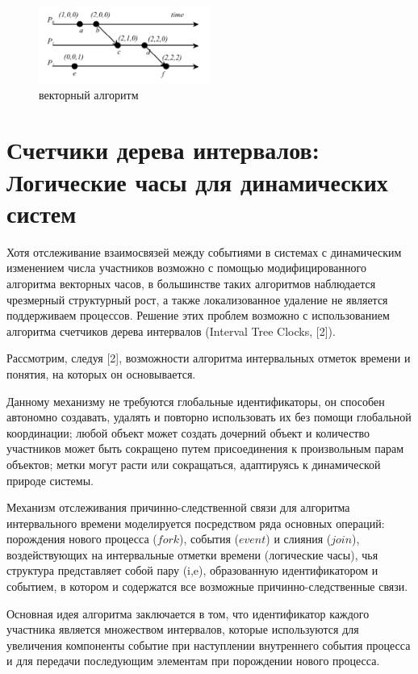 \begin{figure}
\centering
\includegraphics[width=0.5\textwidth]{img/vector.jpg}
\caption{векторный алгоритм}
\end{figure}

\section{Счетчики дерева интервалов: Логические часы для динамических систем}
Хотя отслеживание взаимосвязей между событиями в системах с динамическим изменением числа участников возможно с помощью модифицированного алгоритма векторных часов, в большинстве таких алгоритмов наблюдается чрезмерный структурный рост, а также локализованное удаление не является поддерживаем процессов. Решение этих проблем возможно с использованием алгоритма счетчиков дерева интервалов (Interval Tree Clocks, [2]).\par
Рассмотрим, следуя [2], возможности алгоритма интервальных отметок времени и понятия, на которых он основывается.\par
Данному механизму не требуются глобальные идентификаторы, он способен автономно создавать, удалять и повторно использовать их без помощи глобальной координации; любой объект может создать дочерний объект и количество участников может быть сокращено путем присоединения к произвольным парам объектов; метки могут расти или сокращаться, адаптируясь к динамической природе системы.\par
Механизм отслеживания причинно-следственной связи для алгоритма интервального времени моделируется посредством ряда основных операций: порождения нового процесса ($fork$), события ($event$) и слияния ($join$), воздействующих на интервальные отметки времени (логические часы), чья структура представляет собой пару (i,e), образованную идентификатором и событием, в котором и содержатся все возможные причинно-следственные связи.\par
Основная идея алгоритма заключается в том, что идентификатор каждого участника является множеством интервалов, которые используются для увеличения компоненты событие при наступлении внутреннего события процесса и для передачи последующим элементам при порождении нового процесса.\par 
